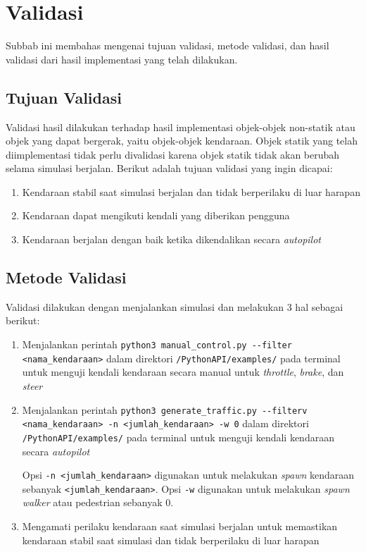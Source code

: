 \section{Validasi}

Subbab ini membahas mengenai tujuan validasi, metode validasi, dan hasil
validasi dari hasil implementasi yang telah dilakukan.

\subsection{Tujuan Validasi}

Validasi hasil dilakukan terhadap hasil implementasi objek-objek non-statik atau
objek yang dapat bergerak, yaitu objek-objek kendaraan. Objek statik yang telah
diimplementasi tidak perlu divalidasi karena objek statik tidak akan berubah
selama simulasi berjalan. Berikut adalah tujuan validasi yang ingin dicapai:

\begin{enumerate}
    \item Kendaraan stabil saat simulasi berjalan dan tidak berperilaku di luar
    harapan
    \item Kendaraan dapat mengikuti kendali yang diberikan pengguna
    \item Kendaraan berjalan dengan baik ketika dikendalikan secara
    \textit{autopilot}
\end{enumerate}

\subsection{Metode Validasi}

Validasi dilakukan dengan menjalankan simulasi dan melakukan 3 hal sebagai
berikut:

\begin{enumerate}

    \item Menjalankan perintah \verb|python3 manual_control.py --filter|
    \verb|<nama_kendaraan>| dalam direktori \verb|/PythonAPI/examples/| pada
    terminal untuk menguji kendali kendaraan secara manual untuk
    \textit{throttle}, \textit{brake}, dan \textit{steer}

    \item Menjalankan perintah \verb|python3 generate_traffic.py --filterv|
    \verb|<nama_kendaraan> -n <jumlah_kendaraan> -w 0| dalam direktori \verb|/PythonAPI/examples/|
    pada terminal untuk menguji kendali kendaraan secara \textit{autopilot}

    Opsi \verb|-n <jumlah_kendaraan>| digunakan untuk melakukan \textit{spawn}
    kendaraan sebanyak \verb|<jumlah_kendaraan>|. Opsi \verb|-w| digunakan untuk
    melakukan \textit{spawn} \textit{walker} atau pedestrian sebanyak 0.

    \item Mengamati perilaku kendaraan saat simulasi berjalan untuk memastikan
    kendaraan stabil saat simulasi dan tidak berperilaku di luar harapan

\end{enumerate}

